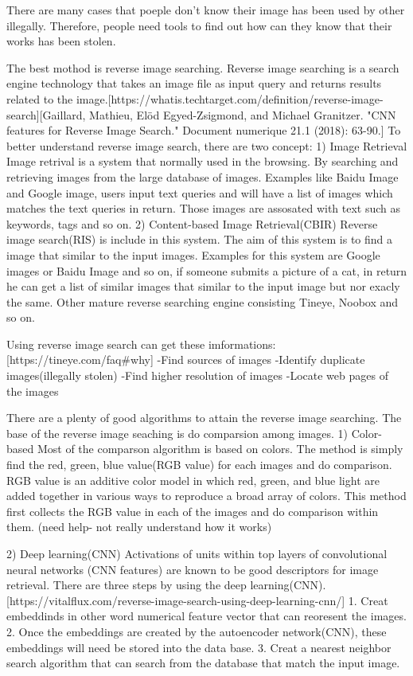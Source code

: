 There are many cases that poeple don't know their image has been used by other illegally.
Therefore, people need tools to find out how can they know that their works has been stolen.

The best mothod is reverse image searching.
Reverse image searching is a search engine technology that takes an image file as input query and returns results related to the image.[https://whatis.techtarget.com/definition/reverse-image-search][Gaillard, Mathieu, Elöd Egyed-Zsigmond, and Michael Granitzer. "CNN features for Reverse Image Search." Document numerique 21.1 (2018): 63-90.]
To better understand reverse image search, there are two concept:
1) Image Retrieval
Image retrival is a system that normally used in the browsing.
By searching and retrieving images from the large database of images.
Examples like Baidu Image and Google image, users input text queries and will have a list of images which matches the text queries in return.
Those images are assosated with text such as keywords, tags and so on.
2) Content-based Image Retrieval(CBIR)
Reverse image search(RIS) is include in this system.
The aim of this system is to find a image that similar to the input images.
Examples for this system are Google images or Baidu Image and so on,
if someone submits a picture of a cat, in return he can get a list of similar images that similar to the input image but nor exacly the same.
Other mature reverse searching engine consisting Tineye, Noobox and so on.

Using reverse image search can get these imformations:[https://tineye.com/faq#why]
-Find sources of images
-Identify duplicate images(illegally stolen)
-Find higher resolution of images
-Locate web pages of the images

There are a plenty of good algorithms to attain the reverse image searching.
The base of the reverse image seaching is do comparsion among images.
1) Color-based
Most of the comparson algorithm is based on colors.
The method is simply find the red, green, blue value(RGB value) for each images and do comparison.
RGB value is an additive color model in which red, green, and blue light are added together in various ways to reproduce a broad array of colors.
This method first collects the RGB value in each of the images and do comparison within them. (need help- not really understand how it works)

2) Deep learning(CNN)
Activations of units within top layers of convolutional neural networks (CNN features) are known to be good descriptors for image retrieval.
There are three steps by using the deep learning(CNN).[https://vitalflux.com/reverse-image-search-using-deep-learning-cnn/]
1. Creat embeddinds in other word numerical feature vector that can reoresent the images.
2. Once the embeddings are created by the autoencoder network(CNN), these embeddings will need be stored into the data base.
3. Creat a nearest neighbor search algorithm that can search from the database that match the input image.

